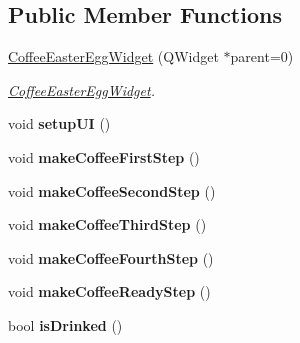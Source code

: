 \subsection*{Public Member Functions}
\begin{DoxyCompactItemize}
\item 
\hyperlink{classGui_1_1Widgets_1_1CoffeeEasterEggWidget_ab95b38ef0c96088bf8b0d0352d8073fb}{Coffee\-Easter\-Egg\-Widget} (Q\-Widget $\ast$parent=0)
\begin{DoxyCompactList}\small\item\em \hyperlink{classGui_1_1Widgets_1_1CoffeeEasterEggWidget}{Coffee\-Easter\-Egg\-Widget}. \end{DoxyCompactList}\item 
\hypertarget{classGui_1_1Widgets_1_1CoffeeEasterEggWidget_ae79445a901344a963fc98172fbb3bbd1}{void {\bfseries setup\-U\-I} ()}\label{classGui_1_1Widgets_1_1CoffeeEasterEggWidget_ae79445a901344a963fc98172fbb3bbd1}

\item 
\hypertarget{classGui_1_1Widgets_1_1CoffeeEasterEggWidget_a17acbe1eeebcd0155cd9fdabf6f8001a}{void {\bfseries make\-Coffee\-First\-Step} ()}\label{classGui_1_1Widgets_1_1CoffeeEasterEggWidget_a17acbe1eeebcd0155cd9fdabf6f8001a}

\item 
\hypertarget{classGui_1_1Widgets_1_1CoffeeEasterEggWidget_a9fd4dcc4291612f880c7d36a1cbd3c53}{void {\bfseries make\-Coffee\-Second\-Step} ()}\label{classGui_1_1Widgets_1_1CoffeeEasterEggWidget_a9fd4dcc4291612f880c7d36a1cbd3c53}

\item 
\hypertarget{classGui_1_1Widgets_1_1CoffeeEasterEggWidget_ab468afccbc650083b3f30382bc5f8645}{void {\bfseries make\-Coffee\-Third\-Step} ()}\label{classGui_1_1Widgets_1_1CoffeeEasterEggWidget_ab468afccbc650083b3f30382bc5f8645}

\item 
\hypertarget{classGui_1_1Widgets_1_1CoffeeEasterEggWidget_a57504081f4694b34c1e5f5f76fe7a6ae}{void {\bfseries make\-Coffee\-Fourth\-Step} ()}\label{classGui_1_1Widgets_1_1CoffeeEasterEggWidget_a57504081f4694b34c1e5f5f76fe7a6ae}

\item 
\hypertarget{classGui_1_1Widgets_1_1CoffeeEasterEggWidget_a85b1ce67ec9c50cf90dfff64a4a2f5d8}{void {\bfseries make\-Coffee\-Ready\-Step} ()}\label{classGui_1_1Widgets_1_1CoffeeEasterEggWidget_a85b1ce67ec9c50cf90dfff64a4a2f5d8}

\item 
\hypertarget{classGui_1_1Widgets_1_1CoffeeEasterEggWidget_ad1442572de3c59eefec9928a4322130e}{bool {\bfseries is\-Drinked} ()}\label{classGui_1_1Widgets_1_1CoffeeEasterEggWidget_ad1442572de3c59eefec9928a4322130e}

\end{DoxyCompactItemize}


